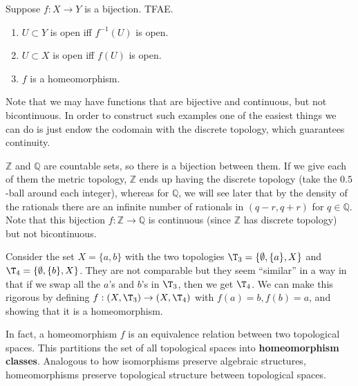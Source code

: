   \begin{theorem}
    Suppose $f: X \rightarrow Y$ is a bijection. TFAE. 
    \begin{enumerate}
      \item $U \subset Y$ is open iff $f^{-1} (U)$ is open. 
      \item $U \subset X$ is open iff $f(U)$ is open. 
      \item $f$ is a homeomorphism. 
    \end{enumerate}
  \end{theorem} 

  Note that we may have functions that are bijective and continuous, but not bicontinuous. In order to construct such examples one of the easiest things we can do is just endow the codomain with the discrete topology, which guarantees continuity. 

  \begin{example}
    $\mathbb{Z}$ and $\mathbb{Q}$ are countable sets, so there is a bijection between them. If we give each of them the metric topology, $\mathbb{Z}$ ends up having the discrete topology (take the $0.5$-ball around each integer), whereas for $\mathbb{Q}$, we will see later that by the density of the rationals there are an infinite number of rationals in $(q - r, q + r)$ for $q \in \mathbb{Q}$. Note that this bijection $f: \mathbb{Z} \rightarrow \mathbb{Q}$ is continuous (since $\mathbb{Z}$ has discrete topology) but not bicontinuous. 
  \end{example}


  \begin{example}
    Consider the set $X = \{a, b\}$ with the two topologies $\T_3 = \{\emptyset, \{a\}, X\}$ and $\T_4 = \{\emptyset, \{b\}, X\}$. They are not comparable but they seem ``similar'' in a way in that if we swap all the $a$'s and $b$'s in $\T_3$, then we get $\T_4$. We can make this rigorous by defining $f: (X, \T_3) \rightarrow (X, \T_4)$ with $f(a) = b, f(b) = a$, and showing that it is a homeomorphism. 
  \end{example}

  In fact, a homeomorphism $f$ is an equivalence relation between two topological spaces. This partitions the set of all topological spaces into \textbf{homeomorphism classes}. Analogous to how isomorphisms preserve algebraic structures, homeomorphisms preserve topological structure between topological spaces. 

